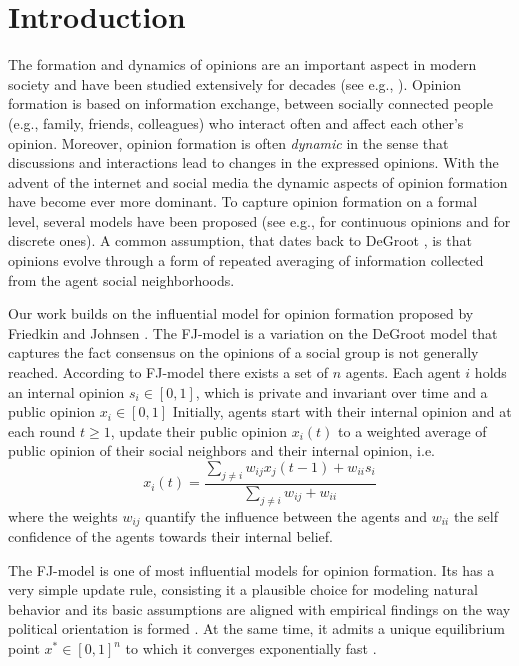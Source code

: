 \section{Introduction}
The formation and dynamics of opinions are an important aspect in modern
society and have been studied extensively for decades (see e.g., \cite{Jackson}).
Opinion formation is based on information exchange, between socially
connected people (e.g., family, friends, colleagues) who interact often
and affect each other's opinion. Moreover, opinion
formation is often \emph{dynamic} in the sense that discussions and
interactions lead to changes in the expressed opinions. With the
advent of the internet and social media the dynamic aspects of
opinion formation have become ever more dominant. To capture opinion formation
on a formal level, several models have been proposed
(see e.g., \cite{DeGroot,FJ90,HK,BKO11,GS14,BGM13} for
continuous opinions and \cite{FGV12,YOASS13,BFM16} for discrete ones).
A common assumption, that dates back to DeGroot \cite{DeGroot}, is
that opinions evolve through a form of repeated averaging of
information collected from the agent social neighborhoods.

Our work builds on the influential model for opinion formation
proposed by Friedkin and Johnsen \cite{FJ90}.
The FJ-model is a variation on the DeGroot model 
that captures the fact consensus on the opinions
of a social group is not generally reached.  
According to FJ-model there exists a set of $n$ agents.
Each agent $i$ holds an
internal opinion $s_i\in [0,1]$, which is private and
invariant over time and a public opinion $x_i \in [0,1]$
Initially, agents start with their internal opinion and at
each round $t\geq1$, update their public opinion
$x_i(t)$ to a weighted average of public opinion of
their social neighbors and their internal opinion, i.e.
%
\begin{equation}\label{eq:FJ_model}
  x_i(t)= \frac{\sum_{j\neq i}w_{ij}x_j(t-1)
    + w_{ii}s_i}{\sum_{j\neq i}w_{ij}+w_{ii}}
\end{equation}
%
where the weights $w_{ij}$ quantify the influence between
the agents and $w_{ii}$ the self confidence of the agents
towards their internal belief. 

The FJ-model is one of most influential models for opinion formation.
Its has a very simple update rule, consisting it a plausible choice
for modeling natural behavior and 
its basic assumptions are aligned with empirical 
findings on the way political orientation is formed \cite{AFH05,K47}.
At the same time, it admits a unique equilibrium point 
$x^* \in [0,1]^n$ to which it converges exponentially fast \cite{GS14}.

